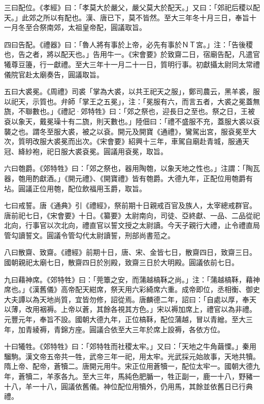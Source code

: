 \begin{pinyinscope}
 三曰配位。《孝經》曰：「孝莫大於嚴父，嚴父莫大於配天。」又曰：「郊祀后稷以配天。」此郊之所以有配也。漢、唐已下，莫不皆然。至大三年冬十月三日，奉旨十一月冬至合祭南郊，太祖皇帝配，圓議取旨。



 四曰告配。《禮器》曰：「魯人將有事於上帝，必先有事於ＮＴ宮。」注：「告後稷也，告之者，將以配天也。」告用牛一。《宋會要》於致齋二日，宿廟告配，凡遣官犧尊豆籩，行一獻禮。至大三年十一月二十一日，質明行事。初獻攝太尉同太常禮儀院官赴太廟奏告，圓議取旨。



 五曰大裘冕。《周禮》司裘「掌為大裘，以共王祀天之服」，鄭司農云，黑羊裘，服以祀天，示質也。弁師「掌王之五冕」，注：「冕服有六，而言五者，大裘之冕蓋無旒，不聯數也。」《禮記·郊特牲》曰：「郊之祭也，迎長日之至也。祭之日，王被袞以象天，戴冕璪十有二旒，則天數也。」陸佃曰：「禮不盛服不充，蓋服大裘以袞襲之也。謂冬至服大裘，被之以袞。開元及開寶《通禮》，鸞駕出宮，服袞冕至大次，質明改服大裘冕而出次。《宋會要》紹興十三年，車駕自廟赴青城，服通天冠、絳紗袍，祀日服大裘袞冕。圓議用袞冕，取旨。



 六曰匏爵。《郊特牲》曰：「郊之祭也，器用陶匏，以象天地之性也。」注謂：「陶瓦器，匏用酌獻酒。」《開元禮》、《開寶禮》皆有匏爵。大德九年，正配位用匏爵有坫。圓議正位用匏，配位飲福用玉爵，取旨。



 七曰戒誓。唐《通典》引《禮經》，祭前期十日親戒百官及族人，太宰總戒群官。唐前祀七日，《宋會要》十日。《纂要》太尉南向，司徒、亞終獻、一品、二品從祀北向，行事官以次北向，禮直官以誓文授之太尉讀。今天子親行大禮，止令禮直局管勾讀誓文。圓議令管勾代太尉讀誓，刑部尚書蒞之。



 八曰散齋、致齋。《禮經》前期十日，唐、宋、金皆七日，散齋四日，致齋三日。國朝親祀太廟七日，散齋四日於別殿，致齋三日於大明殿。圓議依前七日。



 九曰藉神席。《郊特牲》曰：「莞簟之安，而蒲越槁鞂之尚。」注：「蒲越槁鞂，藉神席也。」《漢舊儀》高帝配天紺席，祭天用六彩綺席六重。成帝即位，丞相衡、御史大夫譚以為天地尚質，宜皆勿修，詔從焉。唐麟德二年，詔曰：「自處以厚，奉天以薄，改用裀褥。上帝以蒼，其餘各視其方色。」宋以褥加席上，禮官以為非禮。元豐元年，奉旨不設。國朝大德九年，正位槁鞂，配位蒲越，冒以青繒。至大三年，加青綾褥，青錦方座。圓議合依至大三年於席上設褥，各依方位。



 十曰犧牲。《郊特牲》曰：「郊特牲而社稷太牢。」又曰：「天地之牛角繭慄。」秦用騮駒。漢文帝五帝共一牲，武帝三年一祀，用太牢。光武採元始故事，天地共犢。隋上帝、配帝，蒼犢二。唐開元用牛。宋正位用蒼犢一，配位太牢一。國朝大德九年，蒼犢二，羊豕各九。至大三年，馬純色肥腯一，牲正副一，鹿一十八，野豬一十八，羊一十八，圓議依舊儀。神位配位用犢外，仍用馬，其餘並依舊日已行典禮。




\end{pinyinscope}
